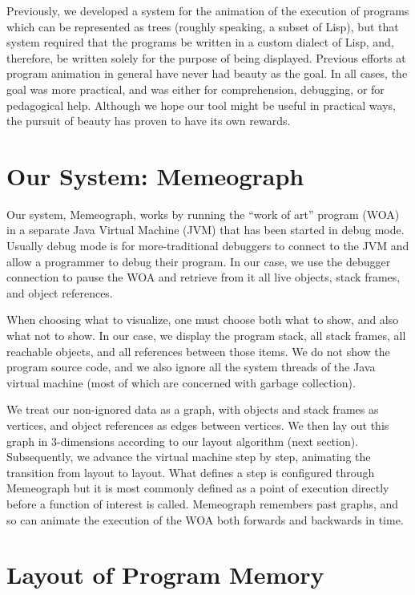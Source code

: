 \documentclass[11pt]{article}
\begin{document}
Previously, we developed a system\cite{boca} for the animation of the execution
of programs which can be represented as trees (roughly speaking, a subset of
Lisp), but that system required that the programs be written in a custom
dialect of Lisp, and, therefore, be written solely for the purpose of being
displayed.  Previous efforts at program animation in general have never had
beauty as the goal.  In all cases, the goal was more practical, and was either
for comprehension, debugging, or for pedagogical help.  Although we hope our
tool might be useful in practical ways, the pursuit of beauty has proven to
have its own rewards.

\section{Our System: Memeograph}

Our system, Memeograph, works by running the ``work of art'' program (WOA) in a
separate Java Virtual Machine (JVM) that has been started in debug mode.
Usually debug mode is for more-traditional debuggers to connect to the JVM and
allow a programmer to debug their program. In our case, we use the debugger
connection to pause the WOA and retrieve from it all live objects, stack
frames, and object references.

When choosing what to visualize, one must choose both what to show, and also
what not to show.  In our case, we display the program stack, all stack frames,
all reachable objects, and all references between those items.  We do not
show the program source code, and we also ignore all the system threads of the
Java virtual machine (most of which are concerned with garbage collection).

We treat our non-ignored data as a graph, with objects and stack frames as
vertices, and object references as edges between vertices.  We then lay out
this graph in 3-dimensions according to our layout algorithm (next section).
Subsequently, we advance the virtual machine step by step, animating the
transition from layout to layout. What defines a step is configured through
Memeograph but it is most commonly defined as a point of execution directly
before a function of interest is called. Memeograph remembers past graphs,
and so can animate the execution of the WOA both forwards and backwards in
time.

\section{Layout of Program Memory}
\label{sec:layout}
\end{document}
